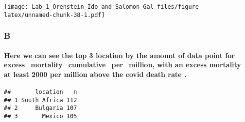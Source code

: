 \documentclass[
]{article}
\newenvironment{Shaded}{\begin{snugshade}}{\end{snugshade}}
\newcommand{\DecValTok}[1]{\textcolor[rgb]{0.00,0.00,0.81}{#1}}
\newcommand{\FunctionTok}[1]{\textcolor[rgb]{0.00,0.00,0.00}{#1}}
\newcommand{\NormalTok}[1]{#1}
\newcommand{\OtherTok}[1]{\textcolor[rgb]{0.56,0.35,0.01}{#1}}
\newcommand{\SpecialCharTok}[1]{\textcolor[rgb]{0.00,0.00,0.00}{#1}}
\begin{document}
\texttt{[image: Lab\_1\_Orenstein\_Ido\_and\_Salomon\_Gal\_files/figure-latex/unnamed-chunk-38-1.pdf]}

\hypertarget{b-7}{%
\subsubsection{B}\label{b-7}}

\hypertarget{here-we-can-see-the-top-3-location-by-the-amount-of-data-point-for-excess_mortality_cumulative_per_million-with-an-excess-mortality-at-least-2000-per-million-above-the-covid-death-rate-.}{%
\paragraph{Here we can see the top 3 location by the amount of data
point for excess\_mortality\_cumulative\_per\_million, with an excess
mortality at least 2000 per million above the covid death rate
.}\label{here-we-can-see-the-top-3-location-by-the-amount-of-data-point-for-excess_mortality_cumulative_per_million-with-an-excess-mortality-at-least-2000-per-million-above-the-covid-death-rate-.}}

\begin{Shaded}
\end{Shaded}

\begin{verbatim}
##       location   n
## 1 South Africa 112
## 2     Bulgaria 107
## 3       Mexico 105
\end{verbatim}
\end{document}
